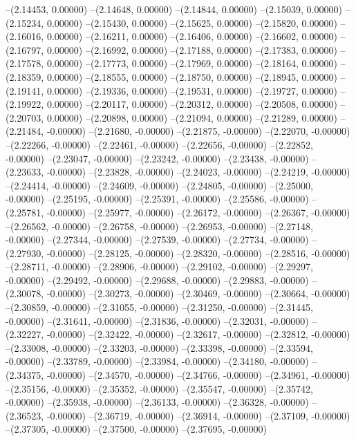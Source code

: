 --(2.14453, 0.00000)
--(2.14648, 0.00000)
--(2.14844, 0.00000)
--(2.15039, 0.00000)
--(2.15234, 0.00000)
--(2.15430, 0.00000)
--(2.15625, 0.00000)
--(2.15820, 0.00000)
--(2.16016, 0.00000)
--(2.16211, 0.00000)
--(2.16406, 0.00000)
--(2.16602, 0.00000)
--(2.16797, 0.00000)
--(2.16992, 0.00000)
--(2.17188, 0.00000)
--(2.17383, 0.00000)
--(2.17578, 0.00000)
--(2.17773, 0.00000)
--(2.17969, 0.00000)
--(2.18164, 0.00000)
--(2.18359, 0.00000)
--(2.18555, 0.00000)
--(2.18750, 0.00000)
--(2.18945, 0.00000)
--(2.19141, 0.00000)
--(2.19336, 0.00000)
--(2.19531, 0.00000)
--(2.19727, 0.00000)
--(2.19922, 0.00000)
--(2.20117, 0.00000)
--(2.20312, 0.00000)
--(2.20508, 0.00000)
--(2.20703, 0.00000)
--(2.20898, 0.00000)
--(2.21094, 0.00000)
--(2.21289, 0.00000)
--(2.21484, -0.00000)
--(2.21680, -0.00000)
--(2.21875, -0.00000)
--(2.22070, -0.00000)
--(2.22266, -0.00000)
--(2.22461, -0.00000)
--(2.22656, -0.00000)
--(2.22852, -0.00000)
--(2.23047, -0.00000)
--(2.23242, -0.00000)
--(2.23438, -0.00000)
--(2.23633, -0.00000)
--(2.23828, -0.00000)
--(2.24023, -0.00000)
--(2.24219, -0.00000)
--(2.24414, -0.00000)
--(2.24609, -0.00000)
--(2.24805, -0.00000)
--(2.25000, -0.00000)
--(2.25195, -0.00000)
--(2.25391, -0.00000)
--(2.25586, -0.00000)
--(2.25781, -0.00000)
--(2.25977, -0.00000)
--(2.26172, -0.00000)
--(2.26367, -0.00000)
--(2.26562, -0.00000)
--(2.26758, -0.00000)
--(2.26953, -0.00000)
--(2.27148, -0.00000)
--(2.27344, -0.00000)
--(2.27539, -0.00000)
--(2.27734, -0.00000)
--(2.27930, -0.00000)
--(2.28125, -0.00000)
--(2.28320, -0.00000)
--(2.28516, -0.00000)
--(2.28711, -0.00000)
--(2.28906, -0.00000)
--(2.29102, -0.00000)
--(2.29297, -0.00000)
--(2.29492, -0.00000)
--(2.29688, -0.00000)
--(2.29883, -0.00000)
--(2.30078, -0.00000)
--(2.30273, -0.00000)
--(2.30469, -0.00000)
--(2.30664, -0.00000)
--(2.30859, -0.00000)
--(2.31055, -0.00000)
--(2.31250, -0.00000)
--(2.31445, -0.00000)
--(2.31641, -0.00000)
--(2.31836, -0.00000)
--(2.32031, -0.00000)
--(2.32227, -0.00000)
--(2.32422, -0.00000)
--(2.32617, -0.00000)
--(2.32812, -0.00000)
--(2.33008, -0.00000)
--(2.33203, -0.00000)
--(2.33398, -0.00000)
--(2.33594, -0.00000)
--(2.33789, -0.00000)
--(2.33984, -0.00000)
--(2.34180, -0.00000)
--(2.34375, -0.00000)
--(2.34570, -0.00000)
--(2.34766, -0.00000)
--(2.34961, -0.00000)
--(2.35156, -0.00000)
--(2.35352, -0.00000)
--(2.35547, -0.00000)
--(2.35742, -0.00000)
--(2.35938, -0.00000)
--(2.36133, -0.00000)
--(2.36328, -0.00000)
--(2.36523, -0.00000)
--(2.36719, -0.00000)
--(2.36914, -0.00000)
--(2.37109, -0.00000)
--(2.37305, -0.00000)
--(2.37500, -0.00000)
--(2.37695, -0.00000)
